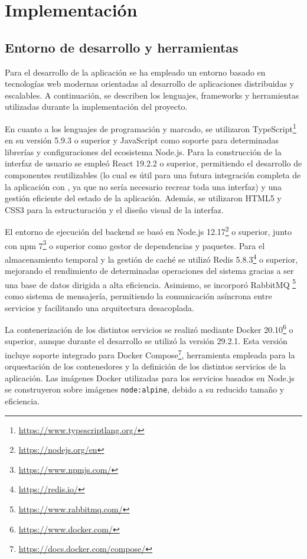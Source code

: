 \chapter{Implementación}
\label{cap:implementacion}

\section{Entorno de desarrollo y herramientas}

Para el desarrollo de la aplicación se ha empleado un entorno basado en tecnologías web modernas orientadas al desarrollo de aplicaciones distribuidas y escalables. A continuación, se describen los lenguajes, frameworks y herramientas utilizadas durante la implementación del proyecto.

En cuanto a los lenguajes de programación y marcado, se utilizaron TypeScript\footnote{\url{https://www.typescriptlang.org/}} en su versión 5.9.3 o superior y JavaScript como soporte para determinadas librerías y configuraciones del ecosistema Node.js. Para la construcción de la interfaz de usuario se empleó React 19.2.2 o superior, permitiendo el desarrollo de componentes reutilizables (lo cual es útil para una futura integración completa de la aplicación con \aer, ya que no sería necesario recrear toda una interfaz) y una gestión eficiente del estado de la aplicación. Además, se utilizaron HTML5 y CSS3 para la estructuración y el diseño visual de la interfaz.

El entorno de ejecución del backend se basó en Node.js 12.17\footnote{\url{https://nodejs.org/en}} o superior, junto con npm 7\footnote{\url{https://www.npmjs.com/}} o superior como gestor de dependencias y paquetes. Para el almacenamiento temporal y la gestión de caché se utilizó Redis 5.8.3\footnote{\url{https://redis.io/}} o superior, mejorando el rendimiento de determinadas operaciones del sistema gracias a ser una base de datos dirigida a alta eficiencia. Asimismo, se incorporó RabbitMQ \footnote{\url{https://www.rabbitmq.com/}} como sistema de mensajería, permitiendo la comunicación asíncrona entre servicios y facilitando una arquitectura desacoplada.

La contenerización de los distintos servicios se realizó mediante Docker 20.10\footnote{\url{https://www.docker.com/}} o superior, aunque durante el desarrollo se utilizó la versión 29.2.1. Esta versión incluye soporte integrado para Docker Compose\footnote{\url{https://docs.docker.com/compose/}}, herramienta empleada para la orquestación de los contenedores y la definición de los distintos servicios de la aplicación. Las imágenes Docker utilizadas para los servicios basados en Node.js se construyeron sobre imágenes \texttt{node:alpine}, debido a su reducido tamaño y eficiencia.

